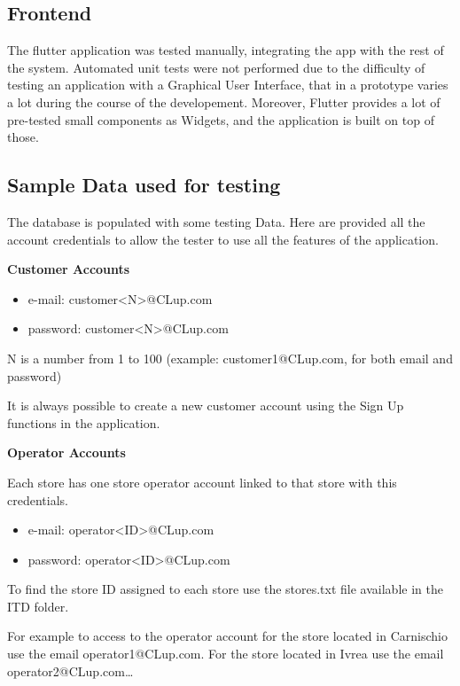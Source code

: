 \subsection{Frontend}

The flutter application was tested manually, integrating the app with the rest of the system. Automated unit tests were not performed due to the difficulty of testing an application with a Graphical User Interface, that in a prototype varies a lot during the course of the developement.
Moreover, Flutter provides a lot of pre-tested small components as Widgets, and the application is built on top of those.

\subsection{Sample Data used for testing}
The database is populated with some testing Data. Here are provided all the account credentials to allow the tester to use all the features of the application.

\textbf{Customer Accounts}
\begin{itemize}
    \item e-mail: customer<N>@CLup.com
    \item password: customer<N>@CLup.com
\end{itemize}

N is a number from 1 to 100
(example: customer1@CLup.com, for both email and password)

It is always possible to create a new customer account using the Sign Up functions in the application.


\bigskip

\textbf{Operator Accounts}

Each store has one store operator account linked to that store with this credentials.

\begin{itemize}
    \item e-mail: operator<ID>@CLup.com
    \item password: operator<ID>@CLup.com
\end{itemize}

To find the store ID assigned to each store use the stores.txt file available in the ITD folder.

For example to access to the operator account for the store located in Carnischio use the email operator1@CLup.com. For the store located in Ivrea use the email operator2@CLup.com\ldots

